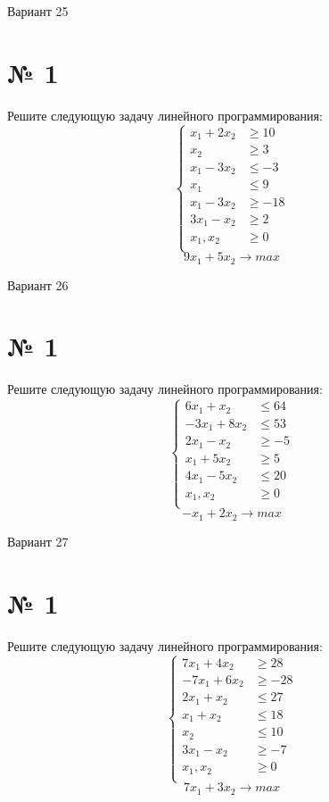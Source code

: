 \documentclass{article}%
\begin{document}
%
\newpage%
\begin{center}%
\begin{Huge}%
Вариант 25%
\end{Huge}%
\end{center}%
\section*{№ 1}%
\label{sec:1}%
Решите следующую задачу линейного программирования: %
\[%
\left\{\begin{aligned}x_{1}+2x_{2} & \ge10 \\x_{2} & \ge3 \\x_{1}-3x_{2} & \le-3 \\x_{1} & \le9 \\x_{1}-3x_{2} & \ge-18 \\3x_{1}-x_{2} & \ge2 \\x_{1},x_{2} & \ge 0 \\\end{aligned}\right.%
\]%
\[%
9x_{1}+5x_{2}  \to max%
\]

%
\newpage%
\begin{center}%
\begin{Huge}%
Вариант 26%
\end{Huge}%
\end{center}%
\section*{№ 1}%
\label{sec:1}%
Решите следующую задачу линейного программирования: %
\[%
\left\{\begin{aligned}6x_{1}+x_{2} & \le64 \\-3x_{1}+8x_{2} & \le53 \\2x_{1}-x_{2} & \ge-5 \\x_{1}+5x_{2} & \ge5 \\4x_{1}-5x_{2} & \le20 \\x_{1},x_{2} & \ge 0 \\\end{aligned}\right.%
\]%
\[%
-x_{1}+2x_{2}  \to max%
\]

%
\newpage%
\begin{center}%
\begin{Huge}%
Вариант 27%
\end{Huge}%
\end{center}%
\section*{№ 1}%
\label{sec:1}%
Решите следующую задачу линейного программирования: %
\[%
\left\{\begin{aligned}7x_{1}+4x_{2} & \ge28 \\-7x_{1}+6x_{2} & \ge-28 \\2x_{1}+x_{2} & \le27 \\x_{1}+x_{2} & \le18 \\x_{2} & \le10 \\3x_{1}-x_{2} & \ge-7 \\x_{1},x_{2} & \ge 0 \\\end{aligned}\right.%
\]%
\[%
7x_{1}+3x_{2}  \to max%
\]
\end{document}
